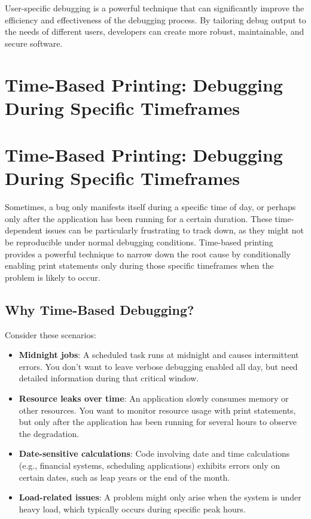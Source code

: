 \documentclass{article}
\begin{document}
{{{User-specific debugging is a powerful technique that can significantly improve the efficiency and effectiveness of the debugging process. By tailoring debug output to the needs of different users, developers can create more robust, maintainable, and secure software.

\newpage

\section*{Time-Based Printing: Debugging During Specific Timeframes} %
\label{chapter-5-9-Time-Based_Printing__Debugging_During_Sp}

\section*{Time-Based Printing: Debugging During Specific Timeframes}

Sometimes, a bug only manifests itself during a specific time of day, or perhaps only after the application has been running for a certain duration. These time-dependent issues can be particularly frustrating to track down, as they might not be reproducible under normal debugging conditions. Time-based printing provides a powerful technique to narrow down the root cause by conditionally enabling print statements only during those specific timeframes when the problem is likely to occur.

\subsection*{Why Time-Based Debugging?}

Consider these scenarios:

\begin{itemize}
    \item \textbf{Midnight jobs}: A scheduled task runs at midnight and causes intermittent errors. You don't want to leave verbose debugging enabled all day, but need detailed information during that critical window.
    \item \textbf{Resource leaks over time}: An application slowly consumes memory or other resources. You want to monitor resource usage with print statements, but only after the application has been running for several hours to observe the degradation.
    \item \textbf{Date-sensitive calculations}: Code involving date and time calculations (e.g., financial systems, scheduling applications) exhibits errors only on certain dates, such as leap years or the end of the month.
    \item \textbf{Load-related issues}: A problem might only arise when the system is under heavy load, which typically occurs during specific peak hours.
\end{itemize}

}}}
\end{document}

